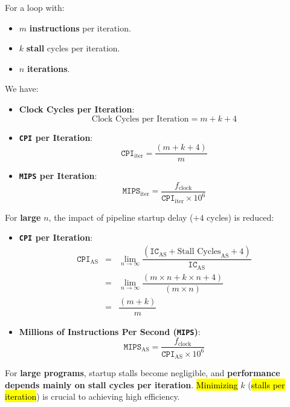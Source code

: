 \highspace
For a loop with:
\begin{itemize}
   \item $m$ \textbf{instructions} per iteration.
   \item $k$ \textbf{stall} cycles per iteration.
   \item $n$ \textbf{iterations}.
\end{itemize}
We have:
\begin{itemize}
   \item \textbf{Clock Cycles per Iteration}:
   \begin{equation}
      \text{Clock Cycles per Iteration} = m + k + 4
   \end{equation}

   \item \textbf{\texttt{CPI} per Iteration}:
   \begin{equation}
      \texttt{CPI}_{\text{iter}} = \dfrac{\left(m + k + 4\right)}{m}
   \end{equation}

   \item \textbf{\texttt{MIPS} per Iteration}:
   \begin{equation}
      \texttt{MIPS}_{\text{iter}} = \dfrac{f_{\text{clock}}}{\texttt{CPI}_{\text{iter}} \times 10^{6}}
   \end{equation}
\end{itemize}
For \textbf{large} $n$, the impact of pipeline startup delay ($+4$ cycles) is reduced:
\begin{itemize}
   \item \textbf{\texttt{CPI} per Iteration}:
   \begin{equation}
      \begin{array}{rcl}
         \texttt{CPI}_{\text{AS}} &=& \underset{n \rightarrow \infty}{\lim} \dfrac{
            \left(\texttt{IC}_{\text{AS}} + \text{Stall Cycles}_{\text{AS}} + 4\right)
         }{
            \texttt{IC}_{\text{AS}}
         } \\ [1em]
         &=& \underset{n \rightarrow \infty}{\lim} \dfrac{
            \left(m \times n + k \times n + 4\right)
         }{
            \left(m \times n\right)
         } \\ [1em]
         &=& \dfrac{\left(m + k\right)}{m}
      \end{array}
   \end{equation}
   
   \item \textbf{Millions of Instructions Per Second (\texttt{MIPS})}:
   \begin{equation}
      \texttt{MIPS}_{\text{AS}} = \dfrac{
         f_{\text{clock}}
      }{
         \texttt{CPI}_{\text{AS}} \times 10^{6}
      }
   \end{equation}
\end{itemize}
For \textbf{large programs}, startup stalls become negligible, and \textbf{performance depends mainly on stall cycles per iteration}. \hl{Minimizing} $k$ (\hl{stalls per iteration}) is crucial to achieving high efficiency.

